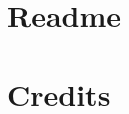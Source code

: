 \newcommand{\DocLanguage}{english}	%
\newcommand{\DocTitle}{Template}	%


\chapter*{Readme}
	
		
\chapter*{Credits}
	

